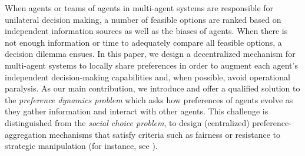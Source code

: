 \documentclass[conference]{ieeeconf}
\begin{document}
When agents or teams of agents in multi-agent systems are responsible for unilateral decision making, a number of feasible options are ranked based on independent information sources as well as the biases of agents. When there is not enough information or time to adequately compare all feasible options, a decision dilemma ensues\cite{lingel2021leveraging}. In this paper, we design a decentralized mechanism for multi-agent systems to locally share preferences in order to augment each agent's independent decision-making capabilities and, when possible, avoid operational paralysis. As our main contribution, we introduce and offer a qualified solution to the \emph{preference dynamics problem} which asks how preferences of agents evolve as they gather information and interact with other agents. This challenge is distinguished from the \emph{social choice problem}, to design (centralized) preference-aggregation mechanisms that satisfy criteria such as fairness or resistance to strategic manipulation (for instance, see \cite{munger2015}).

 


\end{document}
